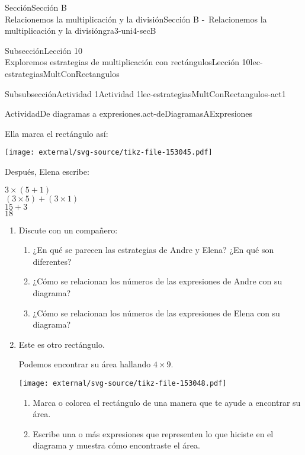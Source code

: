 \begin{sectionptx}{Sección}{{\Large Sección B\\}Relacionemos la multiplicación y la división}{}{Sección B -~Relacionemos la multiplicación y la división}{}{}{gra3-uni4-secB}
\begin{subsectionptx}{Subsección}{{\normalsize Lección 10\\[-0.05cm]}Exploremos estrategias de multiplicación con rectángulos}{}{Lección 10}{}{}{lec-estrategiasMultConRectangulos}
\begin{subsubsectionptx}{Subsubsección}{Actividad 1}{}{Actividad 1}{}{}{lec-estrategiasMultConRectangulos-act1}
\begin{activity}{Actividad}{De diagramas a expresiones.}{act-deDiagramasAExpresiones}
\begin{sidebyside}{3}{0}{0}{0.065}
\begin{sbspanel}{0.35}
Ella marca el rectángulo así:%
\par
\texttt{[image: external/svg-source/tikz-file-153045.pdf]}
\end{sbspanel}%
\begin{sbspanel}{0.25}%
Después, Elena escribe:%
\par
\(3 \times (5 + 1)\)\\
 \((3 \times 5) + (3 \times 1)\)\\
 \(15+3\)\\
 \(18\)%
\end{sbspanel}%
\end{sidebyside}%
%
\begin{enumerate}
\item{}Discute con un compañero:%
%
\begin{enumerate}
\item{}¿En qué se parecen las estrategias de Andre y Elena? ¿En qué son diferentes?%
\item{}¿Cómo se relacionan los números de las expresiones de Andre con su diagrama?%
\item{}¿Cómo se relacionan los números de las expresiones de Elena con su diagrama?%
\end{enumerate}
\clearpage
\vspace*{-2ex}
\item{}
\begin{multicols}{2}
Este es otro rectángulo.\par
Podemos encontrar su área hallando \(4 \times 9\).%
\begin{image}{0}{1}{0}{}%
\texttt{[image: external/svg-source/tikz-file-153048.pdf]}
\end{image}%
\end{multicols}
%
\begin{enumerate}
\item{}Marca o colorea el rectángulo de una manera que te ayude a encontrar su área.%
\item{}Escribe una o más expresiones que representen lo que hiciste en el diagrama y muestra cómo encontraste el área.%
\end{enumerate}
\end{enumerate}
\end{activity}%
\end{subsubsectionptx}
%
%
\typeout{************************************************}
\typeout{************************************************}

\end{subsectionptx}
\end{sectionptx}
